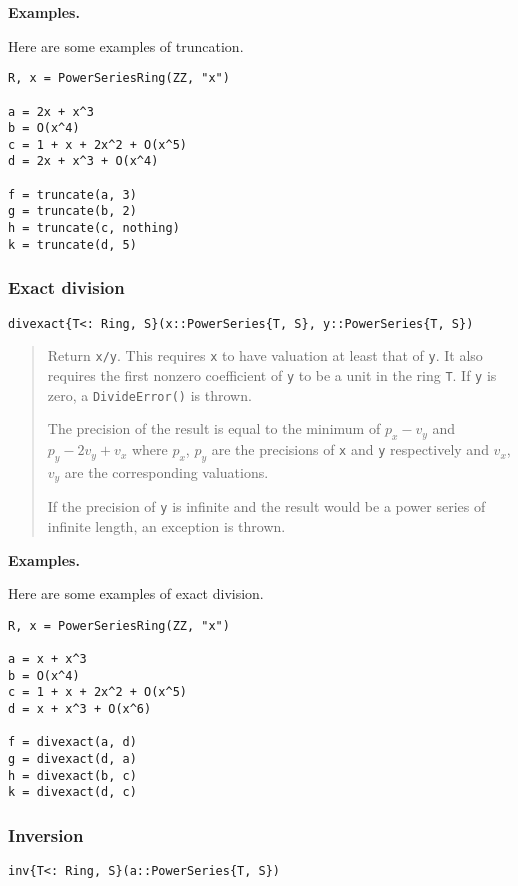 \documentclass[a4paper,10pt]{article}
\newcommand{\code}{\lstinline}
\newcommand{\desc}[1]{\vspace{-3mm}\begin{quote}#1\end{quote}}
\begin{document}
{{{\textbf{Examples.}

Here are some examples of truncation.

\begin{lstlisting}
R, x = PowerSeriesRing(ZZ, "x")

a = 2x + x^3
b = O(x^4)
c = 1 + x + 2x^2 + O(x^5)
d = 2x + x^3 + O(x^4)

f = truncate(a, 3)
g = truncate(b, 2)
h = truncate(c, nothing)
k = truncate(d, 5)
\end{lstlisting}

\subsubsection{Exact division}

\begin{lstlisting}
divexact{T<: Ring, S}(x::PowerSeries{T, S}, y::PowerSeries{T, S})
\end{lstlisting}

\desc{Return \code{x/y}. This requires \code{x} to have valuation at least that
of \code{y}. It also requires the first nonzero coefficient of \code{y} to be
a unit in the ring \code{T}. If \code{y} is zero, a \code{DivideError()} is
thrown. 

The precision of the result is equal to the minimum of $p_x - v_y$
and $p_y - 2v_y + v_x$ where $p_x$, $p_y$ are the precisions of \code{x} and
\code{y} respectively and $v_x$, $v_y$ are the corresponding valuations.

If the precision of \code{y} is infinite and the result would be a power
series of infinite length, an exception is thrown.}

\textbf{Examples.}

Here are some examples of exact division.

\begin{lstlisting}
R, x = PowerSeriesRing(ZZ, "x")

a = x + x^3
b = O(x^4)
c = 1 + x + 2x^2 + O(x^5)
d = x + x^3 + O(x^6)

f = divexact(a, d)
g = divexact(d, a)
h = divexact(b, c)
k = divexact(d, c)
\end{lstlisting}

\subsubsection{Inversion}

\begin{lstlisting}
inv{T<: Ring, S}(a::PowerSeries{T, S})
\end{lstlisting}

}}}
\end{document}
